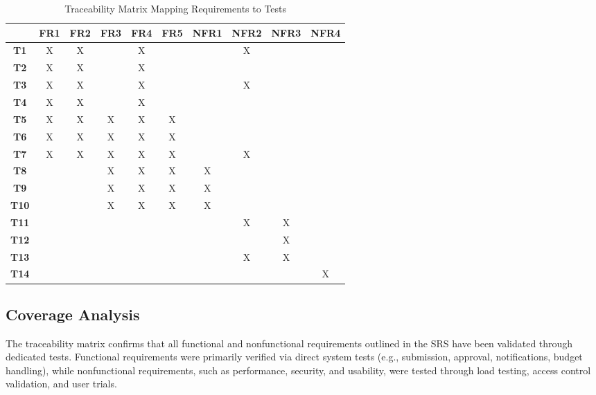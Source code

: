 \documentclass[12pt, titlepage]{article}
\begin{document}
\begin{table}[h!]
  \centering
  \renewcommand{\arraystretch}{1.3}
  \begin{tabular}{|c|c|c|c|c|c|c|c|c|c|}
  \hline
    & FR1 & FR2 & FR3 & FR4 & FR5 & NFR1 & NFR2 & NFR3 & NFR4 \\ \hline
  \textbf{T1}   & X  & X  &    & X  &    &    & X  &    &    \\ \hline
  \textbf{T2}   & X  & X  &    & X  &    &    &    &    &    \\ \hline
  \textbf{T3}   & X  & X  &    & X  &    &    & X  &    &    \\ \hline
  \textbf{T4}   & X  & X  &    & X  &    &    &    &    &    \\ \hline
  \textbf{T5}   & X  & X  & X  & X  & X  &    &    &    &    \\ \hline
  \textbf{T6}   & X  & X  & X  & X  & X  &    &    &    &    \\ \hline
  \textbf{T7}   & X  & X  & X  & X  & X  &    & X  &    &    \\ \hline
  \textbf{T8}   &    &    & X  & X  & X  & X  &    &    &    \\ \hline
  \textbf{T9}   &    &    & X  & X  & X  & X  &    &    &    \\ \hline
  \textbf{T10}  &    &    & X  & X  & X  & X  &    &    &    \\ \hline
  \textbf{T11}  &    &    &    &    &    &    & X  & X  &    \\ \hline
  \textbf{T12}  &    &    &    &    &    &    &    & X  &    \\ \hline
  \textbf{T13}  &    &    &    &    &    &    & X  & X  &    \\ \hline
  \textbf{T14}  &    &    &    &    &    &    &    &    & X  \\ \hline
  \end{tabular}
  \caption{Traceability Matrix Mapping Requirements to Tests}
  \label{tab:traceability_matrix}
\end{table}

\subsection{Coverage Analysis}

The traceability matrix confirms that all functional and nonfunctional requirements outlined in the SRS have been validated through dedicated tests. Functional requirements were primarily verified via direct system tests (e.g., submission, approval, notifications, budget handling), while nonfunctional requirements, such as performance, security, and usability, were tested through load testing, access control validation, and user trials.
\end{document}
